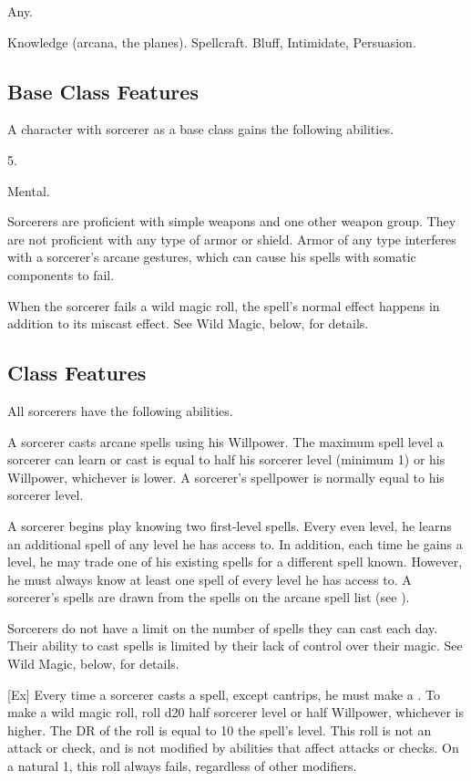  Any.

 Knowledge (arcana, the planes).
 Spellcraft.
 Bluff, Intimidate, Persuasion.

\subsection{Base Class Features}
A character with sorcerer as a base class gains the following abilities.

 5.

  Mental.

Sorcerers are proficient with simple weapons  and one other weapon group.
They are not proficient with any type of armor or shield.
Armor of any type interferes with a sorcerer's arcane gestures, which can cause his spells with somatic components to fail.

When the sorcerer fails a wild magic roll, the spell's normal effect happens in addition to its miscast effect.
See Wild Magic, below, for details.

\subsection{Class Features}
All sorcerers have the following abilities.

A sorcerer casts arcane spells using his Willpower.
The maximum spell level a sorcerer can learn or cast is equal to half his sorcerer level (minimum 1) or his Willpower, whichever is lower.
A sorcerer's spellpower is normally equal to his sorcerer level.

A sorcerer begins play knowing two first-level spells.
Every even level, he learns an additional spell of any level he has access to.
In addition, each time he gains a level, he may trade one of his existing spells for a different spell known.
However, he must always know at least one spell of every level he has access to.
A sorcerer's spells are drawn from the spells on the arcane spell list (see ).

Sorcerers do not have a limit on the number of spells they can cast each day.
Their ability to cast spells is limited by their lack of control over their magic.
See Wild Magic, below, for details.

[Ex]\label{Wild Magic}
Every time a sorcerer casts a spell, except cantrips, he must make a .
To make a wild magic roll, roll d20 \add half sorcerer level or half Willpower, whichever is higher.
The DR of the roll is equal to 10 \add the spell's level.
This roll is not an attack or check, and is not modified by abilities that affect attacks or checks.
On a natural 1, this roll always fails, regardless of other modifiers.

